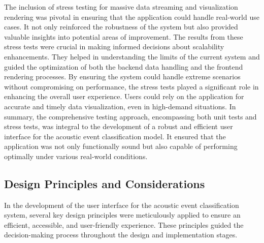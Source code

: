 The inclusion of stress testing for massive data streaming and visualization rendering was pivotal in ensuring that the application could handle real-world use cases. It not only reinforced the robustness of the system but also provided valuable insights into potential areas of improvement. The results from these stress tests were crucial in making informed decisions about scalability enhancements. They helped in understanding the limits of the current system and guided the optimization of both the backend data handling and the frontend rendering processes. By ensuring the system could handle extreme scenarios without compromising on performance, the stress tests played a significant role in enhancing the overall user experience. Users could rely on the application for accurate and timely data visualization, even in high-demand situations. In summary, the comprehensive testing approach, encompassing both unit tests and stress tests, was integral to the development of a robust and efficient user interface for the acoustic event classification model. It ensured that the application was not only functionally sound but also capable of performing optimally under various real-world conditions.

\subsection{Design Principles and Considerations}
In the development of the user interface for the acoustic event classification system, several key design principles were meticulously applied to ensure an efficient, accessible, and user-friendly experience. These principles guided the decision-making process throughout the design and implementation stages.

